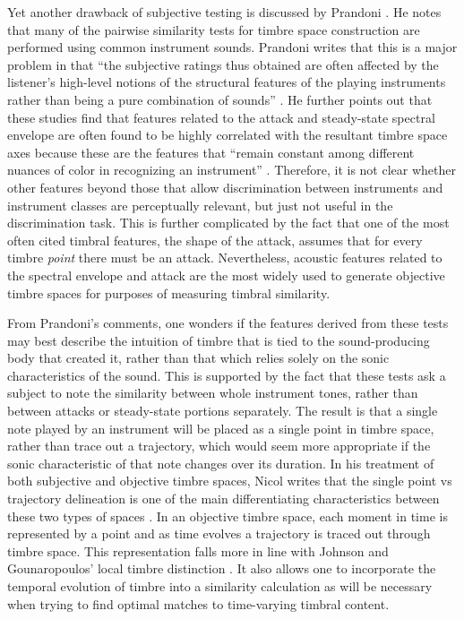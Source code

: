 \documentclass[a4paper,12pt]{report} 	%
\numberwithin{figure}{chapter}
\numberwithin{table}{chapter}
\numberwithin{equation}{chapter}
\begin{document}
\begin{flushleft}
Yet another drawback of subjective testing is discussed by Prandoni \cite{Prandoni:1994th}. He notes that many of the pairwise similarity tests for timbre space construction are performed using common instrument sounds. Prandoni writes that this is a major problem in that ``the subjective ratings thus obtained are often affected by the listener's high-level notions of the structural features of the playing instruments rather than being a pure combination of sounds'' \cite[p. 2]{Prandoni:1994th}. He further points out that these studies find that features related to the attack and steady-state spectral envelope are often found to be highly correlated with the resultant timbre space axes because these are the features that ``remain constant among different nuances of color in recognizing an instrument'' \cite[p. 8]{Prandoni:1994th}. Therefore, it is not clear whether other features beyond those that allow discrimination between instruments and instrument classes are perceptually relevant, but just not useful in the discrimination task. This is further complicated by the fact that one of the most often cited timbral features, the shape of the attack, assumes that for every timbre \emph{point} there must be an attack. Nevertheless, acoustic features related to the spectral envelope and attack are the most widely used to generate objective timbre spaces for purposes of measuring timbral similarity.

From Prandoni's comments, one wonders if the features derived from these tests may best describe the intuition of timbre that is tied to the sound-producing body that created it, rather than that which relies solely on the sonic characteristics of the sound. This is supported by the fact that these tests ask a subject to note the similarity between whole instrument tones, rather than between attacks or steady-state portions separately. The result is that a single note played by an instrument will be placed as a single point in timbre space, rather than trace out a trajectory, which would seem more appropriate if the sonic characteristic of that note changes over its duration. In his treatment of both subjective and objective timbre spaces, Nicol writes that the single point vs trajectory delineation is one of the main differentiating characteristics between these two types of spaces \cite[p. 56]{Nicol:2005rp}. In an objective timbre space, each moment in time is represented by a point and as time evolves a trajectory is traced out through timbre space. This representation falls more in line with Johnson and Gounaropoulos' local timbre distinction \cite{Johnson:2006pi}. It also allows one to incorporate the temporal evolution of timbre into a similarity calculation as will be necessary when trying to find optimal matches to time-varying timbral content.
 

\end{flushleft}
\end{document}
